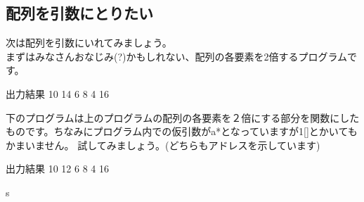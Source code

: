 \subsection{配列を引数にとりたい}
次は配列を引数にいれてみましょう。\\
まずはみなさんおなじみ(?)かもしれない、配列の各要素を2倍するプログラムです。




\begin{itembox}{出力結果}
10 14 6 8 4 16
\end{itembox}

下のプログラムは上のプログラムの配列の各要素を２倍にする部分を関数にしたものです。ちなみにプログラム内での仮引数がa*となっていますが1[]とかいてもかまいません。
試してみましょう。(どちらもアドレスを示しています)




\begin{itembox}{出力結果}
10 12 6 8 4 16
\end{itembox}s

